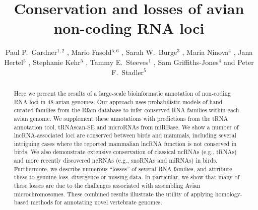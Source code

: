 \documentclass[10pt]{bmc_article}
\newenvironment{bmcformat}{\begin{raggedright}\baselineskip20pt\sloppy\setboolean{publ}{false}}{\end{raggedright}\baselineskip20pt\sloppy}
\begin{document}
\begin{bmcformat}

\title{Conservation and losses of avian non-coding RNA loci}

\author{
Paul P.\ Gardner\correspondingauthor$^{1,2}$
,
Mario Fasold$^{5,6}$
,
Sarah W.\ Burge$^3$
,
Maria Ninova$^4$
,
Jana Hertel$^5$
,
Stephanie Kehr$^5$
,
Tammy E.\ Steeves$^1$
,
Sam Griffiths-Jones$^4$
and
Peter F.\ Stadler\correspondingauthor$^5$
}
\address{
\iid(1) School of Biological Sciences, University of Canterbury, Private Bag 4800, Christchurch, New Zealand.
\iid(2) Biomolecular Interaction Centre, University of Canterbury, Private Bag 4800, Christchurch, New Zealand.
\iid(3) European Molecular Biology Laboratory, European Bioinformatics Institute, Hinxton, Cambridge, CB10 1SD, UK.
\iid(4) Faculty of Life Sciences, University of Manchester, Manchester, United Kingdom.
\iid(5) Bioinformatics Group, Department of Computer Science; and Interdisciplinary Center for Bioinformatics, University of Leipzig, H{\"a}rtelstrasse 16-18, D-04107 Leipzig, Germany.
\iid(6) ecSeq Bioinformatics, Brandvorwerkstr.43, D-04275 Leipzig, Germany.
}

\maketitle

\begin{abstract}
Here we present the results of a large-scale bioinformatic annotation
of non-coding RNA loci in 48 avian genomes. Our approach uses
probabilistic models of hand-curated families from the Rfam database
to infer conserved RNA families within each avian genome. We
supplement these annotations with predictions from the tRNA annotation
tool, tRNAscan-SE and microRNAs from miRBase.  We show a number of
lncRNA-associated loci are conserved between birds and mammals,
including several intriguing cases where the reported mammalian lncRNA
function is not conserved in birds.  We also demonstrate extensive
conservation of classical ncRNAs (e.g., tRNAs) and more recently
discovered ncRNAs (e.g., snoRNAs and miRNAs) in birds. Furthermore, we
describe numerous ``losses'' of several RNA families, and attribute
these to genuine loss, divergence or missing data.  In particular, we
show that many of these losses are due to the challenges associated
with assembling Avian microchromosomes. These combined results illustrate the utility of
applying homology-based methods for annotating novel vertebrate
genomes.
\end{abstract}




\end{bmcformat}
\end{document}
